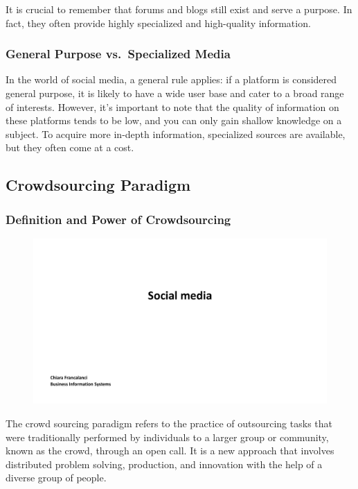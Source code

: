 It is crucial to remember that forums and blogs still exist and serve a
purpose. In fact, they often provide highly specialized and high-quality
information.

\subsubsection{General Purpose vs.~Specialized
  Media}\label{general-purpose-vs.-specialized-media}

In the world of social media, a general rule applies: if a platform is
considered general purpose, it is likely to have a wide user base and
cater to a broad range of interests. However, it's important to note
that the quality of information on these platforms tends to be low, and
you can only gain shallow knowledge on a subject. To acquire more
in-depth information, specialized sources are available, but they often
come at a cost.

\subsection{Crowdsourcing Paradigm}\label{crowdsourcing-paradigm}

\subsubsection{Definition and Power of
  Crowdsourcing}\label{definition-and-power-of-crowdsourcing}

\begin{figure}[!h]
  \centering
  \includegraphics[page=6, trim = 1.5cm 5cm 3cm 4cm, clip, width=\imagewidth]{images/04 - Social_Media.pdf}
\end{figure}

The crowd sourcing paradigm refers to the practice of outsourcing tasks
that were traditionally performed by individuals to a larger group or
community, known as the crowd, through an open call. It is a new
approach that involves distributed problem solving, production, and
innovation with the help of a diverse group of people.

